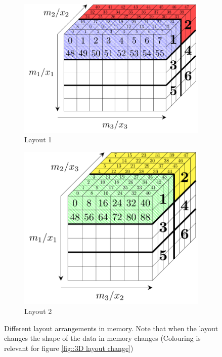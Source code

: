 \begin{figure}[ht]
 \centering
 \begin{subfigure}[t]{0.45\textwidth}
  \centering
  \includegraphics[width=\textwidth]{Figs/DivisionInMemory/FluxSurface}
  \caption{\label{fig::Division in memory Flux} Layout 1}
 \end{subfigure}
 \hspace{0.05\textwidth}
 \begin{subfigure}[t]{0.4\textwidth}
  \centering
  \includegraphics[width=\textwidth]{Figs/DivisionInMemory/VPar}
  \caption{\label{fig::Division in memory VPar} Layout 2}
 \end{subfigure}
 \caption{\label{fig::Division in memory}Different layout arrangements in memory. Note that when the layout changes the shape of the data in memory changes (Colouring is relevant for figure \ref{fig::3D layout change})}
\end{figure}

